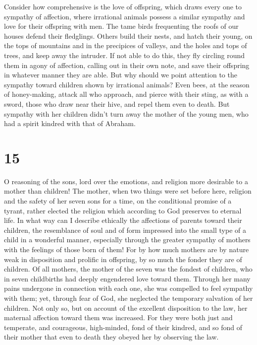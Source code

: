  Consider how comprehensive is the love of offspring, which
draws every one to sympathy of affection,  where irrational
animals possess a similar sympathy and love for their offspring with
men.  The tame birds frequenting the roofs of our houses
defend their fledglings.  Others build their nests, and
hatch their young, on the tops of mountains and in the precipices of
valleys, and the holes and tops of trees, and keep away the intruder.
 If not able to do this, they fly circling round them in
agony of affection, calling out in their own note, and save their
offspring in whatever manner they are able.  But why should
we point attention to the sympathy toward children shown by irrational
animals?  Even bees, at the season of honey-making, attack
all who approach, and pierce with their sting, as with a sword, those
who draw near their hive, and repel them even to death. 
But sympathy with her children didn't turn away the mother of the young
men, who had a spirit kindred with that of Abraham.

\hypertarget{section-14}{%
\section{15}\label{section-14}}

 O reasoning of the sons, lord over the emotions, and
religion more desirable to a mother than children!  The
mother, when two things were set before here, religion and the safety of
her seven sons for a time, on the conditional promise of a tyrant,
 rather elected the religion which according to God
preserves to eternal life.  In what way can I describe
ethically the affections of parents toward their children, the
resemblance of soul and of form impressed into the small type of a child
in a wonderful manner, especially through the greater sympathy of
mothers with the feelings of those born of them!  For by how
much mothers are by nature weak in disposition and prolific in
offspring, by so much the fonder they are of children.  Of
all mothers, the mother of the seven was the fondest of children, who in
seven childbirths had deeply engendered love toward them. 
Through her many pains undergone in connection with each one, she was
compelled to feel sympathy with them;  yet, through fear of
God, she neglected the temporary salvation of her children. 
Not only so, but on account of the excellent disposition to the law, her
maternal affection toward them was increased.  For they
were both just and temperate, and courageous, high-minded, fond of their
kindred, and so fond of their mother that even to death they obeyed her
by observing the law.

